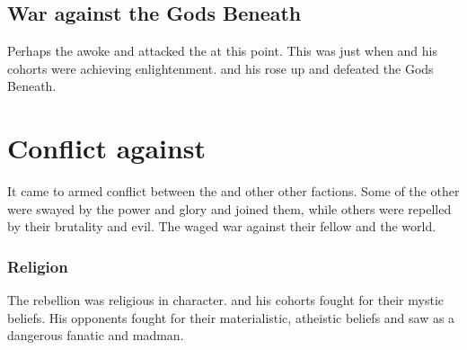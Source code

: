 











\subsection{War against the Gods Beneath}
Perhaps the  awoke and attacked the \ophidians at this point. 
This was just when \Sethicus and his cohorts were achieving enlightenment. 
\Sethicus and his \dragons rose up and defeated the Gods Beneath.















\section{Conflict against \Sethicus}
It came to armed conflict between the \dragons and other other \ophidian factions. 
Some of the other \ophidians{} were swayed by the \psp{\dragons} power and glory and joined them, while others were repelled by their brutality and evil. 
The \dragons{} waged war against their fellow \ophidians{}\prikker and the world.





\subsubsection{Religion}
The rebellion was religious in character. 
\Sethicus and his cohorts fought for their mystic beliefs.
His opponents fought for their materialistic, atheistic beliefs and saw \Sethicus as a dangerous fanatic and madman. 

